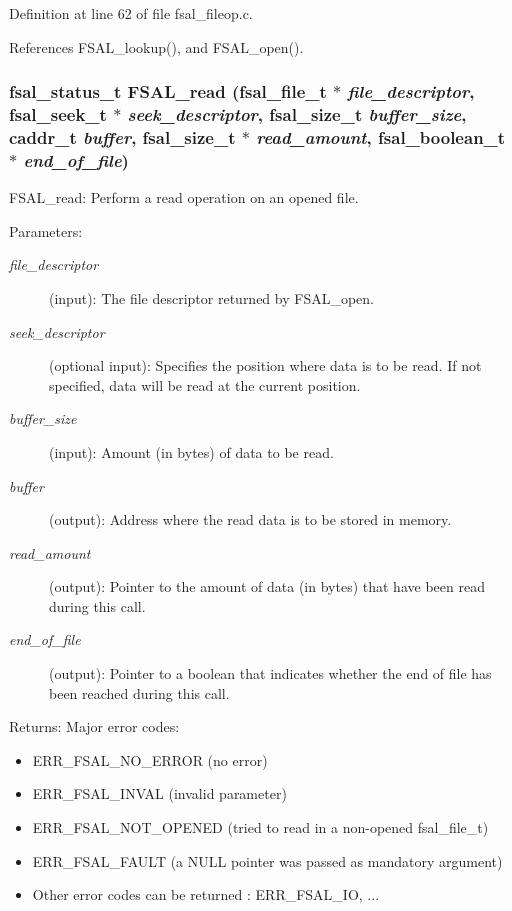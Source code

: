 Definition at line 62 of file fsal\_\-fileop.c.

References FSAL\_\-lookup(), and FSAL\_\-open().
\subsubsection[{FSAL\_\-read}]{\setlength{\rightskip}{0pt plus 5cm}fsal\_\-status\_\-t FSAL\_\-read (fsal\_\-file\_\-t $\ast$ {\em file\_\-descriptor}, \/  fsal\_\-seek\_\-t $\ast$ {\em seek\_\-descriptor}, \/  fsal\_\-size\_\-t {\em buffer\_\-size}, \/  caddr\_\-t {\em buffer}, \/  fsal\_\-size\_\-t $\ast$ {\em read\_\-amount}, \/  fsal\_\-boolean\_\-t $\ast$ {\em end\_\-of\_\-file})}\label{fsal__fileop_8c_280a57629d78eebc53a486d3a9c5f6ae}


FSAL\_\-read: Perform a read operation on an opened file.

\begin{Desc}
\item[Parameters:]
\begin{description}
\item[{\em file\_\-descriptor}](input): The file descriptor returned by FSAL\_\-open. \item[{\em seek\_\-descriptor}](optional input): Specifies the position where data is to be read. If not specified, data will be read at the current position. \item[{\em buffer\_\-size}](input): Amount (in bytes) of data to be read. \item[{\em buffer}](output): Address where the read data is to be stored in memory. \item[{\em read\_\-amount}](output): Pointer to the amount of data (in bytes) that have been read during this call. \item[{\em end\_\-of\_\-file}](output): Pointer to a boolean that indicates whether the end of file has been reached during this call.\end{description}
\end{Desc}
\begin{Desc}
\item[Returns:]Major error codes:\begin{itemize}
\item ERR\_\-FSAL\_\-NO\_\-ERROR (no error)\item ERR\_\-FSAL\_\-INVAL (invalid parameter)\item ERR\_\-FSAL\_\-NOT\_\-OPENED (tried to read in a non-opened fsal\_\-file\_\-t)\item ERR\_\-FSAL\_\-FAULT (a NULL pointer was passed as mandatory argument)\item Other error codes can be returned : ERR\_\-FSAL\_\-IO, ... \end{itemize}
\end{Desc}


